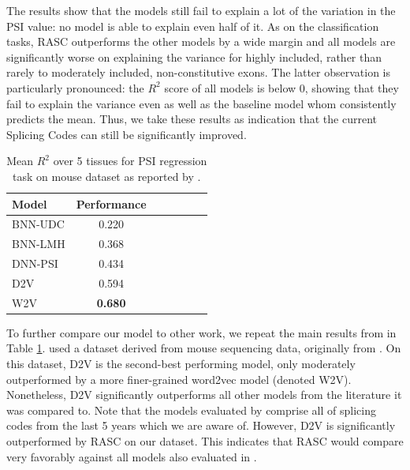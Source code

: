 The results show that the models still fail to explain a lot of the variation in the PSI value: no model is able to explain even half of it. 
As on the classification tasks, RASC outperforms the other models by a wide margin and all models are significantly worse on explaining the variance for highly included, rather than rarely to moderately included, non-constitutive exons. The latter observation is particularly pronounced: the $R^2$ score of all models is below 0, showing that they fail to explain the variance even as well as the baseline model whom consistently predicts the mean. Thus, we take these results as indication that the current Splicing Codes can still be significantly improved. 




\begin{table}
	\centering
	\begin{tabular}{ l c c c c c c} 
		\hline
		Model & Performance \\
		\hline
		BNN-UDC \cite{jha} & 0.220\\
		BNN-LMH \cite{jha}& 0.368\\
		DNN-PSI \cite{jha} & 0.434\\
		D2V \cite{d2vsplicing} & 0.594\\
		W2V \cite{d2vsplicing} & \textbf{0.680}\\
		\hline
	\end{tabular}
	\caption{Mean $R^2$ over 5 tissues for PSI regression task on mouse dataset as reported by \cite{d2vsplicing}. 
	}
	\label{table:ieee_regression}
\end{table}

To further compare our model to other work, we repeat the main results from \cite{d2vsplicing} in Table \ref{table:ieee_regression}. \cite{d2vsplicing} used a dataset derived from mouse sequencing data, originally from \cite{jha}. On this dataset, D2V is the second-best performing model, only moderately outperformed by a more finer-grained word2vec model (denoted W2V). Nonetheless, D2V significantly outperforms all other models from the literature it was compared to. Note that the models evaluated by \cite{d2vsplicing} comprise all of splicing codes from the last 5 years which we are aware of. However, D2V is significantly outperformed by RASC on our dataset. This indicates that RASC would compare very favorably against all models also evaluated in \cite{d2vsplicing}. 

